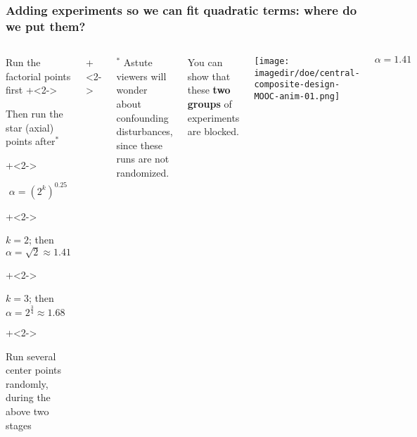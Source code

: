 \begin{frame}\frametitle{Adding experiments so we can fit quadratic terms: where do we put them?}
	\begin{columns}[T]
		
			\vspace{1cm}
			
			\begin{itemize}
				\item	Run the factorial points first
				\onslide+<2->{
					\item	Then run the star (axial) points after$^\ast$
				}
				\onslide+<2->{
					\Large
					\[\alpha  = \left(2^k\right)^{0.25}\]
					
			
					\begin{itemize}
						\onslide+<2->{\item	$k = 2$; then $\alpha = \sqrt{2} \approx 1.41$ }
						\onslide+<2->{\item	$k = 3$; then $\alpha = 2^{\tfrac{3}{4}} \approx 1.68$}
					\end{itemize}
					\normalsize
				}
				\onslide+<2->{
					\item	Run several center points randomly, during the above two stages
				}
			\end{itemize}
			
			\onslide+<2->{
				\vspace{0cm}
				\tiny
				$^\ast$ Astute viewers will wonder about confounding disturbances, since these runs are not randomized.
			
				You can show that these {\color[rgb]{0,0.5,1}\textbf{two}} {\color[rgb]{0.5,0, 0.5}\textbf{groups}} of experiments are blocked.
			}
			
			
			\centerline{\texttt{[image: \\imagedir/doe/central-composite-design-MOOC-anim-01.png]}}
			
			\vspace{-0.5cm}
			\[\alpha = 1.41\]
	\end{columns}
\end{frame}

